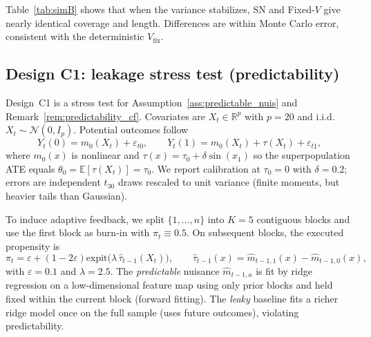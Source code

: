 \documentclass[11pt]{article}
\numberwithin{equation}{section}
\theoremstyle{plain}
\theoremstyle{definition}
\theoremstyle{remark}
\newcommand{\E}{\mathbb{E}}
\newcommand{\expit}{\mathrm{expit}}
\begin{document}
Table~\ref{tab:simB} shows that when the variance stabilizes, SN and Fixed-$V$ give nearly identical coverage and length. Differences are within Monte Carlo error, consistent with the deterministic $V_{\mathrm{fix}}$.

\subsection{Design C1: leakage stress test (predictability)}\label{sec:sim_C1}

Design~C1 is a stress test for Assumption~\ref{ass:predictable_nuis} and Remark~\ref{rem:predictability_cf}. Covariates are $X_t\in\mathbb{R}^{p}$ with $p=20$ and i.i.d.\ $X_t\sim\mathcal{N}(0,I_p)$. Potential outcomes follow
\[
Y_t(0)=m_0(X_t)+\varepsilon_{t0},\qquad
Y_t(1)=m_0(X_t)+\tau(X_t)+\varepsilon_{t1},
\]
where $m_0(x)$ is nonlinear and $\tau(x)=\tau_0+\delta\sin(x_1)$ so the superpopulation ATE equals $\theta_0=\E[\tau(X_t)]=\tau_0$. We report calibration at $\tau_0=0$ with $\delta=0.2$; errors are independent $t_{30}$ draws rescaled to unit variance (finite moments, but heavier tails than Gaussian).

To induce adaptive feedback, we split $\{1,\ldots,n\}$ into $K=5$ contiguous blocks and use the first block as burn-in with $\pi_t\equiv 0.5$. On subsequent blocks, the executed propensity is
\[
\pi_t=\varepsilon+(1-2\varepsilon)\expit\big(\lambda\,\widehat\tau_{t-1}(X_t)\big),\qquad
\widehat\tau_{t-1}(x)=\widehat m_{t-1,1}(x)-\widehat m_{t-1,0}(x),
\]
with $\varepsilon=0.1$ and $\lambda=2.5$. The \emph{predictable} nuisance $\widehat m_{t-1,a}$ is fit by ridge regression on a low-dimensional feature map using only prior blocks and held fixed within the current block (forward fitting). The \emph{leaky} baseline fits a richer ridge model once on the full sample (uses future outcomes), violating predictability.
\end{document}
